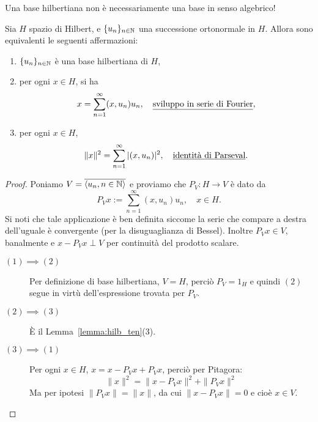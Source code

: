 \begin{remark}
	Una base hilbertiana non è necessariamente una base in senso algebrico!
\end{remark}

\begin{theorem}[di Fourier]
	Sia $H$ spazio di Hilbert, e $\{u_n\}_{n \in \mathbb{N}}$ una successione ortonormale in $H$.
	Allora sono equivalenti le seguenti affermazioni:
	\begin{enumerate}
		\item $\{u_n\}_{n \in \mathbb{N}}$ è una base hilbertiana di $H$,
		\item per ogni $x \in H$, si ha
		\begin{equation*}
			x= \sum_{n=1}^\infty (x,u_n)u_n, \quad \text{\underline{sviluppo in serie di Fourier}},
		\end{equation*}
		\item per ogni $x \in H$,
		\begin{equation*}
			\|x\|^2 = \sum_{n=1}^\infty |(x,u_n)|^2, \quad \text{\underline{identità di Parseval}}.
		\end{equation*}
	\end{enumerate}
\end{theorem}
\begin{proof}
	Poniamo $V = \overline{\langle u_n, n \in \mathbb{N} \rangle}$ e proviamo che $P_V : H \to V$ è dato da
	\begin{equation*}
		P_V x := \sum_{n=1}^\infty (x,u_n)u_n, \quad x \in H.
	\end{equation*}
	Si noti che tale applicazione è ben definita siccome la serie che compare a destra dell'uguale è convergente (per la disuguaglianza di Bessel). Inoltre $P_V x \in V$, banalmente e $x- P_V x \perp V$ per continuità del prodotto scalare.
	\begin{description}
		\item[$(1) \implies (2)$] Per definizione di base hilbertiana, $V=H$, perciò $P_V = 1_H$ e quindi $(2)$ segue in virtù dell'espressione trovata per $P_V$.
		\item[$(2) \implies (3)$] È il Lemma~\ref{lemma:hilb_ten}(3).
		\item[$(3) \implies (1)$] Per ogni $x \in H$, $x = x-P_V x + P_Vx$, perciò per Pitagora:
		\begin{equation*}
			\|x\|^2 = \|x-P_Vx\|^2 + \|P_Vx\|^2
		\end{equation*}
		Ma per ipotesi $\|P_Vx\|=\|x\|$, da cui $\|x-P_Vx\|=0$ e cioè $x \in V$.
	\end{description}
\end{proof}


